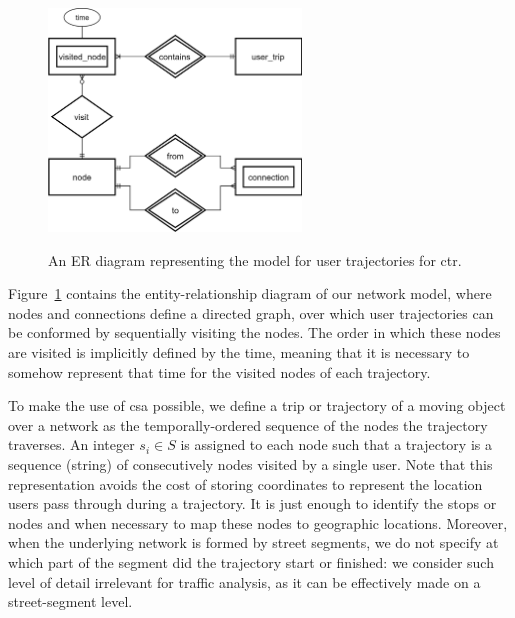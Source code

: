 	\begin{figure}[ht]
		\begin{center}
			{\includegraphics[width=0.6\textwidth]{figures/street_er.png}}
		\end{center}
		\caption{An ER diagram representing the model for user trajectories for \acrshort{ctr}.}
		\label{fig:street_er}
	\end{figure}
    
    Figure~\ref{fig:street_er} contains the entity-relationship diagram of our network model, where nodes and connections define a directed graph, over which user trajectories can be conformed by sequentially visiting the nodes. The order in which these nodes are visited is implicitly defined by the time, meaning that it is necessary to somehow represent that time for the visited nodes of each trajectory.
	
	To make the
	use of \gls{csa} possible, we define a trip or trajectory of a moving object
	over a network as the temporally-ordered sequence of the nodes the trajectory
	traverses. An integer $s_i \in S$ is assigned to each node such that a trajectory is a sequence (string) of consecutively nodes visited by a single user. Note that this representation avoids the cost of storing coordinates to represent the location users pass through during a trajectory. It is just enough to identify the stops or nodes and when necessary to map these nodes to geographic locations. Moreover, when the underlying network is formed by street segments, we do not specify at which part of the segment did the trajectory start or finished: we consider such level of detail irrelevant for traffic analysis, as it can be effectively made on a street-segment level.
	
